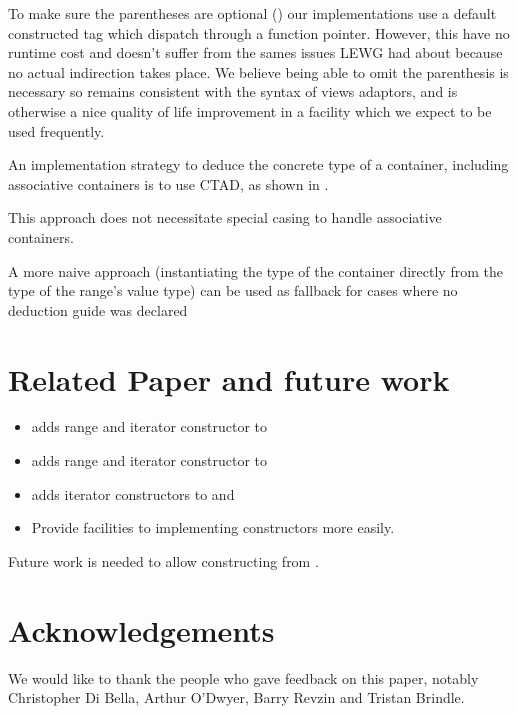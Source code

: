 \documentclass{wg21}
\begin{document}
To make sure the parentheses are optional () our implementations use a default constructed
tag which dispatch through a function pointer.
However, this have no runtime cost
and doesn't suffer from the sames issues LEWG had about  because no actual indirection takes place.
We believe being able to omit the parenthesis is necessary so  remains consistent with the syntax of views adaptors,
and is otherwise a nice quality of life improvement in a facility which we expect to be used frequently.

An implementation strategy to deduce the concrete type of a container, including associative containers is to use CTAD, as shown in \cite{CTAD}.

This approach does not necessitate special casing to handle associative containers.

A more naive approach (instantiating the type of the container directly from the type of the range's value type) can be used as fallback for cases where no deduction guide was declared


\section{Related Paper and future work}

\begin{itemize}
	\item \cite{P1391} adds range and iterator constructor to 
	\item \cite{P1394} adds range and iterator constructor to 
    \item \cite{P1425} adds iterator constructors to  and 
    \item \cite{P1419} Provide facilities to implementing  constructors more easily.
\end{itemize}

Future work is needed to allow constructing  from .

\section{Acknowledgements}
We would like to thank the people who gave feedback on this paper, notably Christopher Di Bella, Arthur O'Dwyer, Barry Revzin
and Tristan Brindle.\\
\end{document}
